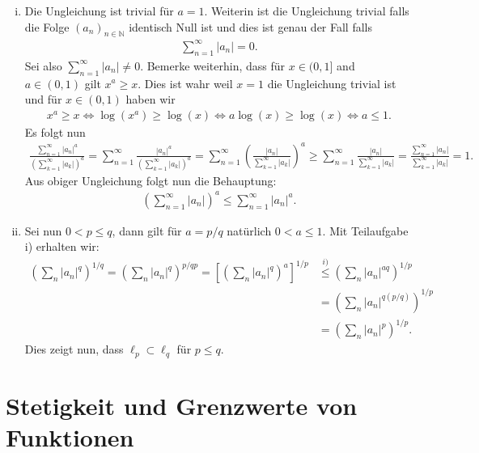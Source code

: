 \documentclass[a4paper, 20]{exam}
\begin{document}
\begin{solution}
\begin{enumerate}[i)]
\item Die Ungleichung ist trivial für $a=1$. Weiterin ist die Ungleichung trivial falls die Folge $(a_n)_{n \in \mathbb{N}}$ identisch Null ist und dies ist genau der Fall falls 
\begin{align*}
\sum_{n=1}^\infty |a_n|=0.
\end{align*}
Sei also $\sum_{n=1}^\infty |a_n| \neq 0$. Bemerke weiterhin, dass für $x \in (0,1]$ and $a \in (0,1)$ gilt $x^a \geq x$. Dies ist wahr weil $x =1$ die Ungleichung trivial ist und für $x \in (0,1)$ haben wir
\begin{align*}
x^a \geq x \iff  \log (x^a) \geq \log (x) \iff a \log(x) \geq \log (x) \iff a \leq 1.
\end{align*}
Es folgt nun
\begin{align*}
\frac{\sum_{n=1}^\infty |a_n|^a}{\left( \sum_{k=1}^\infty |a_k|\right)^a} = \sum_{n=1}^\infty \frac{|a_n|^a}{\left( \sum_{k=1}^\infty |a_k|\right)^a} = \sum_{n=1}^\infty \left( \frac{|a_n|}{\sum_{k=1}^\infty |a_k|}\right)^a \geq \sum_{n=1}^\infty \frac{|a_n|}{\sum_{k=1}^\infty |a_k|} = \frac{\sum_{n=1}^\infty |a_n|}{\sum_{k=1}^\infty |a_k|}=1.
\end{align*}
Aus obiger Ungleichung folgt nun die Behauptung:
\begin{align*}
\left( \sum_{n=1}^\infty |a_n| \right)^a \leq \sum_{n=1}^\infty |a_n|^a.
\end{align*}
\item Sei nun $0 < p \leq q$, dann gilt für $a = p/q$ natürlich $0<a \leq 1$. Mit Teilaufgabe i) erhalten wir:
\begin{align*}
\left( \sum_n |a_n|^q \right)^{1/q} = \left( \sum_n |a_n|^q \right)^{p/qp}  = \left[\left( \sum_{n} |a_n|^q \right)^a\right]^{1/p} &\overset{i)}\leq \left( \sum_n |a_n|^{aq} \right)^{1/p} \\
&= \left( \sum_{n} |a_n|^{q (p/q)} \right)^{1/p} \\
&= \left( \sum_n |a_n|^p \right)^{1/p}.
\end{align*}
Dies zeigt nun, dass $\ell_p \subset \ell_q$ für $p \leq q$. 
\end{enumerate}
\end{solution}

\newpage


\section{Stetigkeit und Grenzwerte von Funktionen}
\end{document}
